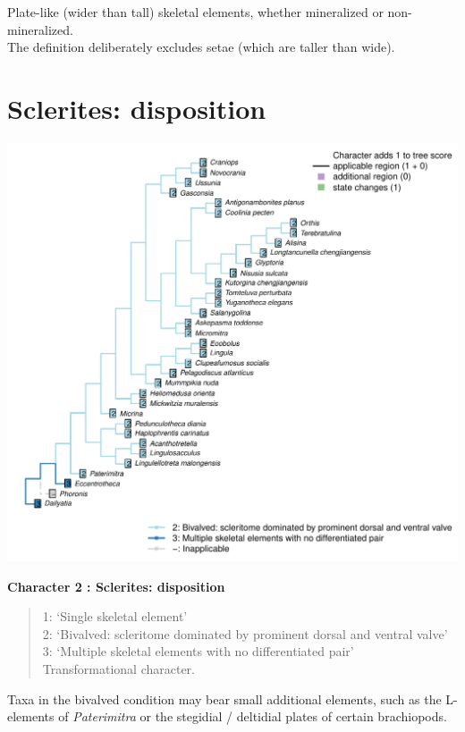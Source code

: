 \documentclass[]{book}
\theoremstyle{definition}
\theoremstyle{definition}
\theoremstyle{definition}
\theoremstyle{remark}
\begin{document}
Plate-like (wider than tall) skeletal elements, whether mineralized or
non-mineralized.\\
The definition deliberately excludes setae (which are taller than wide).

\hypertarget{sclerites-disposition}{%
\section*{Sclerites: disposition}\label{sclerites-disposition}}

\includegraphics{Brachiopod_phylogeny_files/figure-latex/unnamed-chunk-5-2.pdf}

\textbf{Character 2 : Sclerites: disposition }

\begin{quote}
1: `Single skeletal element'\\
2: `Bivalved: scleritome dominated by prominent dorsal and ventral
valve'\\
3: `Multiple skeletal elements with no differentiated pair'\\
Transformational character.
\end{quote}

Taxa in the bivalved condition may bear small additional elements, such
as the L-elements of \emph{Paterimitra} or the stegidial / deltidial
plates of certain brachiopods.
\end{document}
